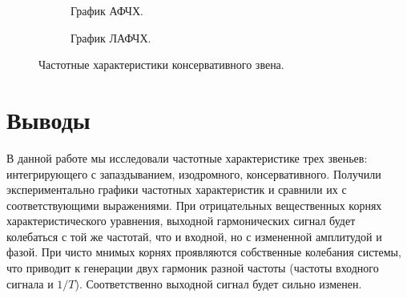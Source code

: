 \documentclass[a4paper, 11pt]{article}
\begin{document}
\begin{figure}[h!]
    \begin{subfigure}{0.5\textwidth}
        \centering
        \caption{График АФЧХ.}
    \end{subfigure}
    \begin{subfigure}{0.5\textwidth}
        \centering
        \caption{График ЛАФЧХ.}
    \end{subfigure}
    \caption{Частотные характеристики консервативного звена.}
\end{figure}

\section*{Выводы}
В данной работе мы исследовали частотные характеристике трех звеньев: интегрирующего с запаздыванием, изодромного, консервативного. Получили экспериментально графики частотных характеристик и сравнили их с соответствующими выражениями. При отрицательных вещественных корнях характеристического уравнения, выходной гармонических сигнал будет колебаться с той же частотай, что и входной, но с измененной амплитудой и фазой. При чисто мнимых корнях проявляются собственные колебания системы, что приводит к генерации двух гармоник разной частоты (частоты входного сигнала и $1/T$). Соответственно выходной сигнал будет сильно изменен.
\end{document}
